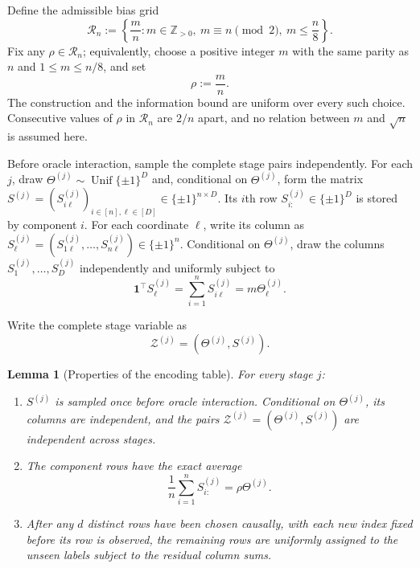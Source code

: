 \documentclass{article}
\newtheorem{lemma}[theorem]{Lemma}
\theoremstyle{definition}
\newcommand{\cZ}{\mathcal{Z}}
\begin{document}
Define the admissible bias grid
\begin{equation}
 \mathcal R_n:=\left\{\frac mn:
 m\in\mathbb Z_{>0},\ m\equiv n\pmod 2,\ m\le\frac n8\right\}.
 \label{eq:admissible-bias-grid}
\end{equation}
Fix any $\rho\in\mathcal R_n$; equivalently, choose a positive integer $m$ with
the same parity as $n$ and $1\le m\le n/8$, and set
\begin{equation}
 \rho:=\frac mn.
 \label{eq:general-m-rho}
\end{equation}
The construction and the information bound are uniform over every such
choice.  Consecutive values of $\rho$ in $\mathcal R_n$ are $2/n$ apart, and no
relation between $m$ and $\sqrt n$ is assumed here.

Before oracle interaction, sample the complete stage pairs independently.  For
each $j$, draw $\Theta^{(j)}\sim\operatorname{Unif}\{\pm1\}^D$ and, conditional on
$\Theta^{(j)}$, form the matrix
$S^{(j)}=(S^{(j)}_{i\ell})_{i\in[n],\ell\in[D]}\in\{\pm1\}^{n\times D}$.
Its $i$th row $S^{(j)}_{i:}\in\{\pm1\}^D$ is stored by component $i$.
For each coordinate $\ell$, write its column as
$S^{(j)}_\ell=(S^{(j)}_{1\ell},\ldots,S^{(j)}_{n\ell})\in\{\pm1\}^n$.
Conditional on $\Theta^{(j)}$, draw the columns
$S^{(j)}_1,\ldots,S^{(j)}_D$ independently and uniformly subject to
\begin{equation}
 \mathbf 1^\top S^{(j)}_\ell
 =\sum_{i=1}^nS^{(j)}_{i\ell}
 =m\Theta^{(j)}_\ell.
 \label{eq:column-constraint}
\end{equation}

Write the complete stage variable as
\begin{equation}
    \cZ^{(j)}=(\Theta^{(j)},S^{(j)}).
\end{equation}
\begin{lemma}[Properties of the encoding table]
\label{lem:encoding-table-properties}
For every stage $j$:
\begin{enumerate}[label=\textup{(\roman*)},leftmargin=*,itemsep=2pt]
 \item $S^{(j)}$ is sampled once before oracle interaction.  Conditional on
 $\Theta^{(j)}$, its columns are independent, and the pairs
 $\cZ^{(j)}=(\Theta^{(j)},S^{(j)})$ are independent across stages.
 \item The component rows have the exact average
 \begin{equation}
  \frac1n\sum_{i=1}^nS^{(j)}_{i:}=\rho\Theta^{(j)}.
  \label{eq:exact-code-average}
 \end{equation}
 \item After any $d$ distinct rows have been chosen causally, with each new
 index fixed before its row is observed, the remaining rows are uniformly
 assigned to the unseen labels subject to the residual column sums.
\end{enumerate}
\end{lemma}
\end{document}
